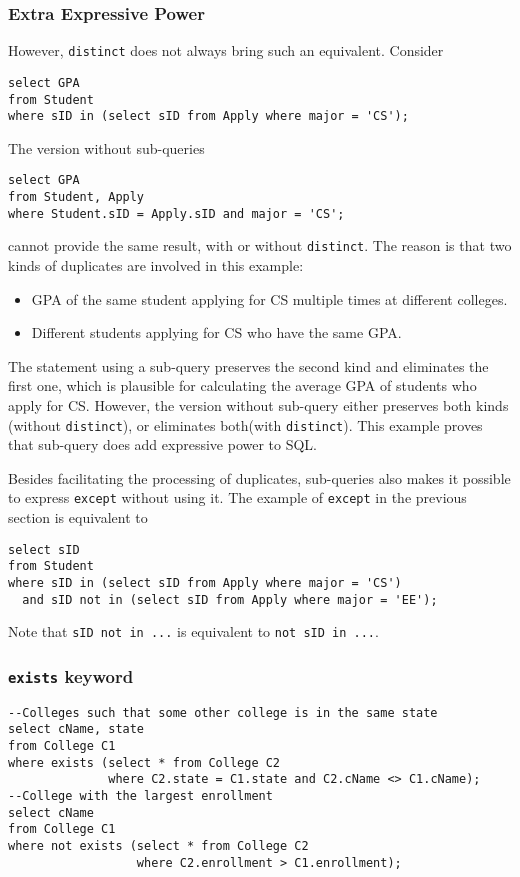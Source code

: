 \subsubsection{Extra Expressive Power}
However, \texttt{distinct} does not always bring such an equivalent. Consider
\begin{lstlisting}
select GPA
from Student
where sID in (select sID from Apply where major = 'CS');
\end{lstlisting}
The version without sub-queries
\begin{lstlisting}
select GPA
from Student, Apply
where Student.sID = Apply.sID and major = 'CS';
\end{lstlisting}
cannot provide the same result, with or without \texttt{distinct}. The reason is that two kinds of duplicates are involved in this example:
\begin{itemize}
\item GPA of the same student applying for CS multiple times at different colleges.
\item Different students applying for CS who have the same GPA.
\end{itemize}
The statement using a sub-query preserves the second kind and eliminates the first one, which is plausible for calculating the average GPA of students who apply for CS. However, the version without sub-query either preserves both kinds (without \texttt{distinct}), or eliminates both(with \texttt{distinct}). This example proves that sub-query does add expressive power to SQL.

Besides facilitating the processing of duplicates, sub-queries also makes it possible to express \texttt{except} without using it. The example of \texttt{except} in the previous section is equivalent to
\begin{lstlisting}
select sID 
from Student
where sID in (select sID from Apply where major = 'CS')
  and sID not in (select sID from Apply where major = 'EE');
\end{lstlisting}
Note that \texttt{sID not in ...} is equivalent to \texttt{not sID in ...}.
\subsubsection{\texttt{exists} keyword}
\begin{lstlisting}
--Colleges such that some other college is in the same state
select cName, state
from College C1
where exists (select * from College C2 
              where C2.state = C1.state and C2.cName <> C1.cName);
--College with the largest enrollment
select cName
from College C1
where not exists (select * from College C2
                  where C2.enrollment > C1.enrollment);
\end{lstlisting}
